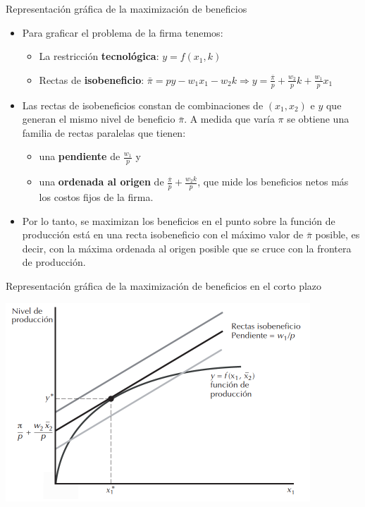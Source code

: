 \documentclass{beamer}
\theoremstyle{definition}
\begin{document}
\begin{frame}{Representación gráfica de la maximización de beneficios}
\begin{itemize}
	\item Para graficar el problema de la firma tenemos:
	\begin{itemize}
		\item La restricción \textbf{tecnológica}: $y= f(x_{1},k)$
		\item Rectas de \textbf{isobeneficio}: $\bar{\pi}=py-w_{1}x_{1}-w_{2}k \Longrightarrow y=\frac{\bar{\pi}}{p}+\frac{w_{2}}{p}k+\frac{w_{1}}{p}x_{1}$
	\end{itemize}
	\item Las rectas de isobeneficios constan de combinaciones de $(x_1,x_2)$ e $y$ que generan el mismo nivel de beneficio $\bar{\pi}$. A medida que varía $\pi$ se obtiene una familia de rectas paralelas que tienen:
	\begin{itemize}
	    \item una \textbf{pendiente} de $\frac{w_1}{p}$ y 
\item una \textbf{ordenada al origen} de $\frac{\bar{\pi}}{p} + \frac{w_2k}{p}$, que mide los beneficios netos más los costos fijos de la firma.
	\end{itemize}
\item Por lo tanto, se maximizan los beneficios en el punto sobre la función de producción está en una recta isobeneficio con el m\'aximo valor de $\bar{\pi}$ posible, es decir, con la máxima ordenada al origen posible que se cruce con la frontera de producción.
\end{itemize}
\end{frame}

\begin{frame}{\small Representación gráfica de la maximización de beneficios en el corto plazo}
		\begin{center}
\includegraphics[width=4.5in]{figures3/maxben.png}
\end{center}
\end{frame}
\end{document}
